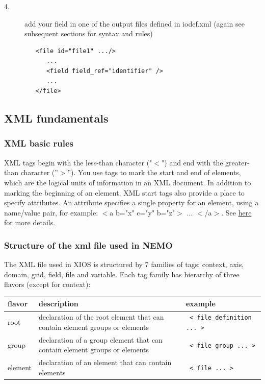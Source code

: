 \begin{description}
\item[4.] add your field in one of the output files defined in iodef.xml (again see subsequent sections for syntax and rules)   \\
\vspace{-20pt}
\begin{alltt}  {{\scriptsize
\begin{verbatim}
   <file id="file1" .../>   
      ...
      <field field_ref="identifier" />   
      ...
   </file>   
\end{verbatim}
}}\end{alltt} 

\end{description}
\subsection{XML fundamentals}

\subsubsection{ XML basic rules}

XML tags begin with the less-than character ("$<$") and end with the greater-than character (''$>$''). 
You use tags to mark the start and end of elements, which are the logical units of information 
in an XML document. In addition to marking the beginning of an element, XML start tags also 
provide a place to specify attributes. An attribute specifies a single property for an element, 
using a name/value pair, for example: $<$a b="x" c="y" b="z"$>$ ... $<$/a$>$.
See \href{http://www.xmlnews.org/docs/xml-basics.html}{here} for more details.

\subsubsection{Structure of the xml file used in NEMO}

The XML file used in XIOS is structured by 7 families of tags: context, axis, domain, grid, field, file and variable. Each tag family has hierarchy of three flavors (except for context):
\\
\begin{tabular}{|p{3.0cm}|p{4.5cm}|p{4.5cm}|}
   \hline
   flavor &
   description &
   example \\
   \hline
   \hline
   root &
   declaration of the root element that can contain element groups or elements &
   {\scriptsize \verb? < file_definition ... >?} \\
   \hline
   group &
   declaration of a group element that can contain element groups or elements &
   {\scriptsize \verb? < file_group ... >?} \\
   \hline
   element &
   declaration of an element that can contain elements &
   {\scriptsize \verb? < file ... >?} \\
   \hline
\end{tabular}
\\

